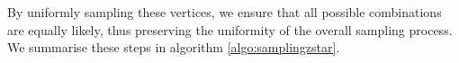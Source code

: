 By uniformly sampling these vertices, we ensure that all possible combinations are equally likely, thus preserving the uniformity of the overall sampling process. We summarise these steps in algorithm \ref{algo:samplingzstar}.




%
%
%

